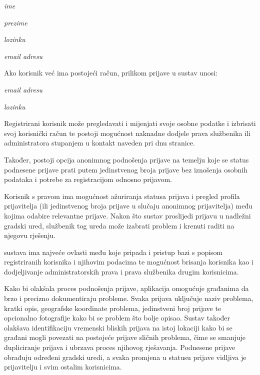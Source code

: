 \begin{packed_item}
	\item \textit{ime}
	\item \textit{prezime}
	\item \textit{lozinku}
	\item \textit{email adresu}
\end{packed_item}

\noindent Ako korisnik već ima postojeći račun, prilikom prijave u sustav unosi:

\begin{packed_item}
	\item \textit{email adresu}
	\item \textit{lozinku}
\end{packed_item}

\noindent Registrirani korisnik može pregledavati i mijenjati svoje osobne podatke i izbrisati svoj korisnički račun te postoji mogućnost naknadne dodjele prava službenika ili administratora stupanjem u kontakt naveden pri dnu stranice.

\noindent Također, postoji opcija anonimnog podnošenja prijave na temelju koje se status podnesene prijave prati putem jedinstvenog broja prijave bez iznošenja osobnih podataka i potrebe za registracijom odnosno prijavom.

Korisnik s pravom  ima mogućnost ažuriranja statusa prijava i pregled profila prijavitelja (ili jedinstvenog broja prijave u slučaju anonimnog prijavitelja) među kojima odabire relevantne prijave. Nakon što sustav proslijedi prijavu u nadležni gradski ured, službenik tog ureda može izabrati problem i krenuti raditi na njegovu rješenju.


 sustava ima najveće ovlasti među koje pripada i pristup bazi s popisom registriranih korisnika i njihovim podacima te mogućnost brisanja korisnika kao i dodjeljivanje administratorskih prava i prava službenika drugim korisnicima.

\noindent Kako bi olakšala proces podnošenja prijave, aplikacija omogućuje građanima da brzo i precizno dokumentiraju probleme. Svaka prijava uključuje naziv problema, kratki opis, geografske koordinate problema, jedinstveni broj prijave te opcionalno fotografije kako bi se problem što bolje opisao.
\noindent Sustav također olakšava identifikaciju vremenski bliskih prijava na istoj lokaciji kako bi se građani mogli povezati na postojeće prijave sličnih problema, čime se smanjuje dupliciranje prijava i ubrzava proces njihovog rješavanja.
\noindent Podnesene prijave obrađuju određeni gradski uredi, a svaka promjena u statusu prijave vidljiva je prijavitelju i svim ostalim korisnicima.

